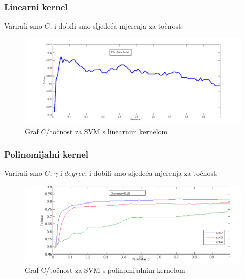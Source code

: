 \documentclass[conference]{IEEEtran}
\begin{document}
\subsubsection{Linearni kernel}

Varirali smo $C$, i dobili smo sljedeća mjerenja za točnost:

\begin{figure}[H]
\begin{minipage}{0.5\textwidth}
\centering
\includegraphics[width=\textwidth]{images/paraCLinear.png}
\caption{Graf $C$/točnost za SVM s linearnim kernelom}
\end{minipage}
\end{figure}

\subsubsection{Polinomijalni kernel}

Varirali smo $C$, $\gamma$ i $degree$, i dobili smo sljedeća mjerenja za točnost:

\begin{figure}[H]
\begin{minipage}{0.5\textwidth}
\centering
\includegraphics[width=\textwidth]{images/paramCPoly.png}
\caption{Graf C/točnost za SVM s polinomijalnim kernelom}
\end{minipage}
\end{figure}
\end{document}
